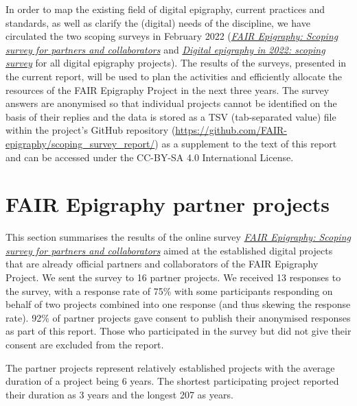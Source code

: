 \documentclass[
  12pt,
]{scrreprt}
\begin{document}
In order to map the existing field of digital epigraphy, current
practices and standards, as well as clarify the (digital) needs of the
discipline, we have circulated the two scoping surveys in February 2022
(\href{https://github.com/FAIR-epigraphy/scoping_survey_report/data/01_Survey_partners_questions.pdf}{\emph{FAIR
Epigraphy: Scoping survey for partners and collaborators}} and
\href{https://github.com/FAIR-epigraphy/scoping_survey_report/data/02_Survey_projects_questions.pdf}{\emph{Digital
epigraphy in 2022: scoping survey}} for all digital epigraphy projects).
The results of the surveys, presented in the current report, will be
used to plan the activities and efficiently allocate the resources of
the FAIR Epigraphy Project in the next three years. The survey answers
are anonymised so that individual projects cannot be identified on the
basis of their replies and the data is stored as a TSV (tab-separated
value) file within the project's GitHub repository
(\url{https://github.com/FAIR-epigraphy/scoping_survey_report/}) as a
supplement to the text of this report and can be accessed under the
CC-BY-SA 4.0 International License.

\hypertarget{fair-epigraphy-partner-projects}{%
\chapter{FAIR Epigraphy partner
projects}\label{fair-epigraphy-partner-projects}}

This section summarises the results of the online survey
\href{https://github.com/FAIR-epigraphy/scoping_survey_report/data/01_Survey_partners_questions.pdf}{\emph{FAIR
Epigraphy: Scoping survey for partners and collaborators}} aimed at the
established digital projects that are already official partners and
collaborators of the FAIR Epigraphy Project. We sent the survey to 16
partner projects. We received 13 responses to the survey, with a
response rate of 75\% with some participants responding on behalf of two
projects combined into one response (and thus skewing the response
rate). 92\% of partner projects gave consent to publish their anonymised
responses as part of this report. Those who participated in the survey
but did not give their consent are excluded from the report.

The partner projects represent relatively established projects with the
average duration of a project being 6 years. The shortest participating
project reported their duration as 3 years and the longest 207 as years.
\end{document}
